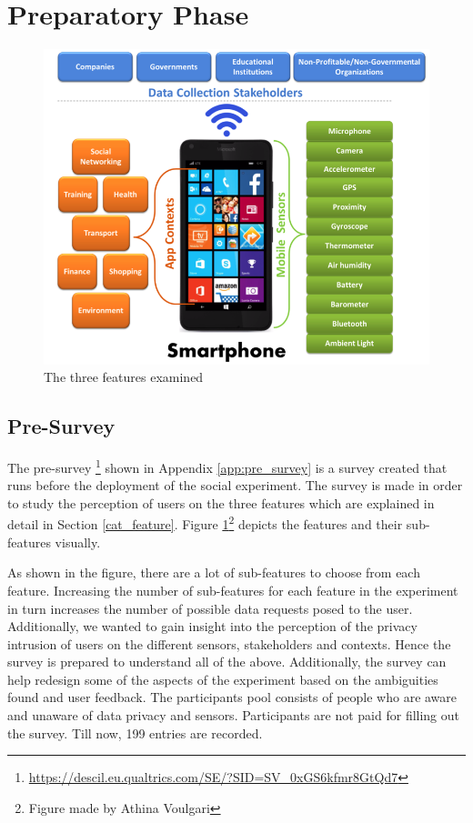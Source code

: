 \section{Preparatory Phase} \label{prep}

\begin{figure}[ht!]
\centering
\includegraphics[width=\textwidth,keepaspectratio]{./images/all_features}
\caption{The three features examined}
\label{fig:all_features}
\end{figure}

\subsection{Pre-Survey}

The pre-survey \footnote{\url{https://descil.eu.qualtrics.com/SE/?SID=SV_0xGS6kfmr8GtQd7}} shown in Appendix \ref{app:pre_survey} is a survey created that runs before the deployment of the social experiment.
The survey is made in order to study the perception of users on the three features which are explained in detail in Section \ref{cat_feature}. Figure \ref{fig:all_features}\footnote{Figure made by Athina Voulgari} depicts the features and their sub-features visually.

As shown in the figure, there are a lot of sub-features to choose from each feature.
Increasing the number of sub-features for each feature in the experiment in turn increases the number of possible data requests posed to the user. Additionally,
we wanted to gain insight into the perception of the privacy intrusion of users on the different sensors, stakeholders and contexts. Hence the survey
is prepared to understand all of the above. Additionally, the survey can help redesign some of the aspects of the experiment based on the
ambiguities found and user feedback. The participants pool consists of people who are aware and unaware of data privacy and sensors. Participants are not paid for filling out the survey. Till now, 199 entries are recorded.

